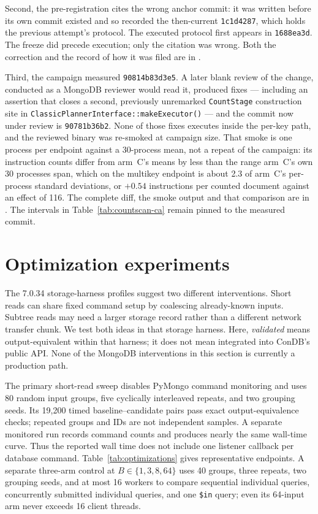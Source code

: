 \documentclass[10pt]{article}
\newcommand{\code}[1]{\texttt{#1}}
\begin{document}
Second, the pre-registration cites the wrong anchor commit: it was written before
its own commit existed and so recorded the then-current \code{1c1d4287}, which
holds the previous attempt's protocol. The executed protocol first appears in
\code{1688ea3d}. The freeze did precede execution; only the citation was wrong.
Both the correction and the record of how it was filed are in
.

Third, the campaign measured \code{90814b83d3e5}. A later blank review of the
change, conducted as a MongoDB reviewer would read it, produced fixes ---
including an assertion that closes a second, previously unremarked
\code{CountStage} construction site in
\code{ClassicPlannerInterface::makeExecutor()} --- and the commit now under
review is \code{90781b36b2}. None of those fixes executes inside the per-key
path, and the reviewed binary was re-smoked at campaign size. That smoke is one
process per endpoint against a 30-process mean, not a repeat of the campaign:
its instruction counts differ from arm~C's means by less than the range arm~C's
own 30 processes span, which on the multikey endpoint is about 2.3 of arm~C's
per-process standard deviations, or $+0.54$ instructions per counted document
against an effect of 116. The complete diff, the smoke
output and that comparison are in
. The intervals in
Table~\ref{tab:countscan-ca} remain pinned to the measured commit.

\section{Optimization experiments}\label{sec:optimization}

The 7.0.34 storage-harness profiles suggest two different interventions. Short
reads can share fixed command setup by coalescing already-known inputs. Subtree
reads may need a larger storage record rather than a different network transfer
chunk. We test both ideas in that storage harness. Here, \emph{validated} means output-equivalent
within that harness; it does not mean integrated into ConDB's public API. None
of the MongoDB interventions in this section is currently a production path.

The primary short-read sweep disables PyMongo command monitoring and uses 80
random input groups, five cyclically interleaved repeats, and two grouping
seeds. Its 19{,}200 timed baseline--candidate pairs pass exact
output-equivalence checks; repeated groups and IDs are not independent samples.
A separate monitored run records command counts and produces nearly the same
wall-time curve. Thus the reported wall time does not include one listener
callback per database command. Table~\ref{tab:optimizations} gives
representative endpoints. A separate three-arm control at
$B\in\{1,3,8,64\}$ uses 40 groups, three repeats, two grouping seeds, and at
most 16 workers to compare sequential individual queries, concurrently
submitted individual queries, and one \code{\$in} query; even its 64-input arm
never exceeds 16 client threads.
\end{document}
